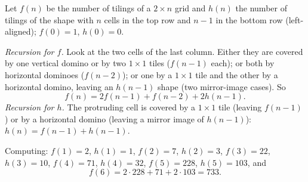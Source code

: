 Let $f(n)$ be the number of tilings of a $2\times n$ grid and $h(n)$ the number of tilings of the shape with $n$ cells in the top row and $n-1$ in the bottom row (left-aligned); $f(0)=1$, $h(0)=0$.

\emph{Recursion for $f$.} Look at the two cells of the last column. Either they are covered by one vertical domino or by two $1\times1$ tiles ($f(n-1)$ each); or both by horizontal dominoes ($f(n-2)$); or one by a $1\times1$ tile and the other by a horizontal domino, leaving an $h(n-1)$ shape (two mirror-image cases). So
\[f(n)=2f(n-1)+f(n-2)+2h(n-1).\]
\emph{Recursion for $h$.} The protruding cell is covered by a $1\times1$ tile (leaving $f(n-1)$) or by a horizontal domino (leaving a mirror image of $h(n-1)$): $h(n)=f(n-1)+h(n-1)$.

Computing: $f(1)=2$, $h(1)=1$, $f(2)=7$, $h(2)=3$, $f(3)=22$, $h(3)=10$, $f(4)=71$, $h(4)=32$, $f(5)=228$, $h(5)=103$, and
\[f(6)=2\cdot228+71+2\cdot103=\boxed{733}.\]
